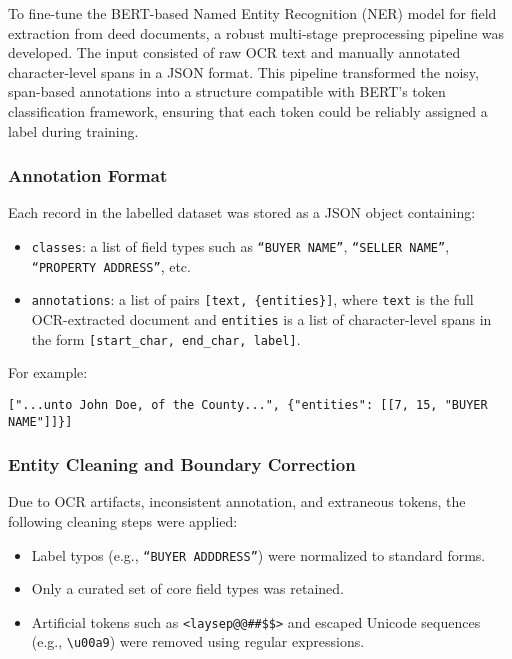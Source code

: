 \documentclass{article}
\begin{document}
To fine-tune the BERT-based Named Entity Recognition (NER) model for field extraction from deed documents, a robust multi-stage preprocessing pipeline was developed. The input consisted of raw OCR text and manually annotated character-level spans in a JSON format. This pipeline transformed the noisy, span-based annotations into a structure compatible with BERT’s token classification framework, ensuring that each token could be reliably assigned a label during training.

\subsubsection{Annotation Format}

Each record in the labelled dataset was stored as a JSON object containing:
\begin{itemize}
    \item \texttt{classes}: a list of field types such as \texttt{``BUYER NAME''}, \texttt{``SELLER NAME''}, \texttt{``PROPERTY ADDRESS''}, etc.
    \item \texttt{annotations}: a list of pairs \texttt{[text, \{entities\}]}, where \texttt{text} is the full OCR-extracted document and \texttt{entities} is a list of character-level spans in the form \texttt{[start\_char, end\_char, label]}.
\end{itemize}

For example:
\begin{verbatim}
["...unto John Doe, of the County...", {"entities": [[7, 15, "BUYER NAME"]]}]
\end{verbatim}

\subsubsection{Entity Cleaning and Boundary Correction}

Due to OCR artifacts, inconsistent annotation, and extraneous tokens, the following cleaning steps were applied:
\begin{itemize}
    \item Label typos (e.g., \texttt{``BUYER ADDDRESS''}) were normalized to standard forms.
    \item Only a curated set of core field types was retained.
    \item Artificial tokens such as \verb|<laysep@@##$$>| and escaped Unicode sequences (e.g., \verb|\u00a9|) were removed using regular expressions.
\end{itemize}
\end{document}
